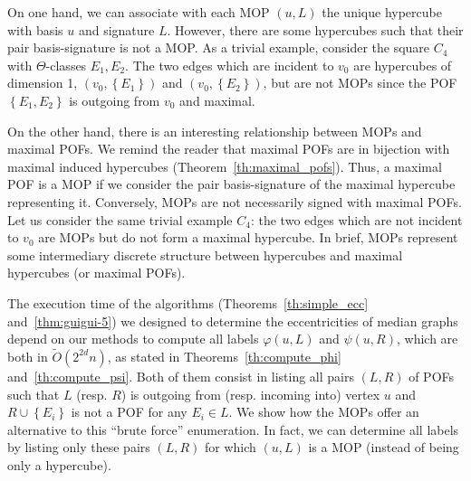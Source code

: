 \documentclass{article}
\newcommand{\set}[1]{\left\{ #1 \right\}}
\begin{document}
On one hand, we can associate with each MOP $(u,L)$ the unique hypercube with basis $u$ and signature $L$. However, there are some hypercubes such that their pair basis-signature is not a MOP. As a trivial example, consider the square $C_4$ with $\Theta$-classes $E_1,E_2$. The two edges which are incident to $v_0$ are hypercubes of dimension 1, $(v_0,\set{E_1})$ and $(v_0,\set{E_2})$, but are not MOPs since the POF $\set{E_1,E_2}$ is outgoing from $v_0$ and maximal.

On the other hand, there is an interesting relationship between MOPs and maximal POFs. We remind the reader that maximal POFs are in bijection with maximal induced hypercubes (Theorem~\ref{th:maximal_pofs}). Thus, a maximal POF is a MOP if we consider the pair basis-signature of the maximal hypercube representing it. Conversely, MOPs are not necessarily signed with maximal POFs. Let us consider the same trivial example $C_4$: the two edges which are not incident to $v_0$ are MOPs but do not form a maximal hypercube. In brief, MOPs represent some intermediary discrete structure between hypercubes and maximal hypercubes (or maximal POFs).

The execution time of the algorithms (Theorems~\ref{th:simple_ecc} and~\ref{thm:guigui-5}) we designed to determine the eccentricities of median graphs depend on our methods to compute all labels $\varphi(u,L)$ and $\psi(u,R)$, which are both in $\tilde{O}(2^{2d}n)$, as stated in Theorems~\ref{th:compute_phi} and~\ref{th:compute_psi}. Both of them consist in listing all pairs $(L,R)$ of POFs such that $L$ (resp. $R$) is outgoing from (resp. incoming into) vertex $u$ and $R \cup \set{E_i}$ is not a POF for any $E_i \in L$. We show how the MOPs offer an alternative to this ``brute force'' enumeration. In fact, we can determine all labels by listing only these pairs $(L,R)$ for which $(u,L)$ is a MOP (instead of being only a hypercube).
\end{document}

